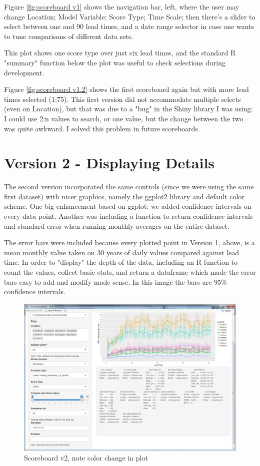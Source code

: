 \documentclass[logos,parttoc,morelanguage=french,morelanguage=german]{orsay-memoire}
\begin{document}
Figure \ref{fig:scoreboard v1} shows the navigation bar, left, where the user may change Location; Model Variable; Score Type; Time Scale; then there's a slider to select between one and 90 lead times, and a date range selector in case one wants to tune comparisons of different data sets. 

This plot shows one score type over just six lead times, and the standard R "summary" function below the plot was useful to check selections during development.

Figure \ref{fig:scoreboard v1.2} shows the first scoreboard again but with more lead times selected (1:75). This first version did not accommodate multiple selects (even on Location), but that was due to a "bug" in the Shiny library I was using: I could use 2:n values to search, or one value, but the change between the two was quite awkward. I solved this problem in future scoreboards.

\section{Version 2 - Displaying Details}

The second version incorporated the same controls (since we were using the same first dataset) with nicer graphics, namely the  \gls{ggplot2} library and default color scheme. One big enhancement based on ggplot: we added confidence intervals on every data point. Another was including a function to return confidence intervals and standard error when running monthly averages on the entire dataset.

The error bars were included because every plotted point in Version 1, above, is a mean monthly value taken on 30 years of daily values compared against lead time. In order to "display" the depth of the data, including an R function to count the values, collect basic stats, and return a dataframe which made the error bars easy to add and modify made sense. In this image the bars are 95\% confidence intervals.

\begin{figure}[H]
\centering
\includegraphics[width=0.7\linewidth]{images/sbdV2v24notes.png}
  \caption{Scoreboard v2, note color change in plot}
  \label{fig:scoreboard v2}
\end{figure}
\end{document}
